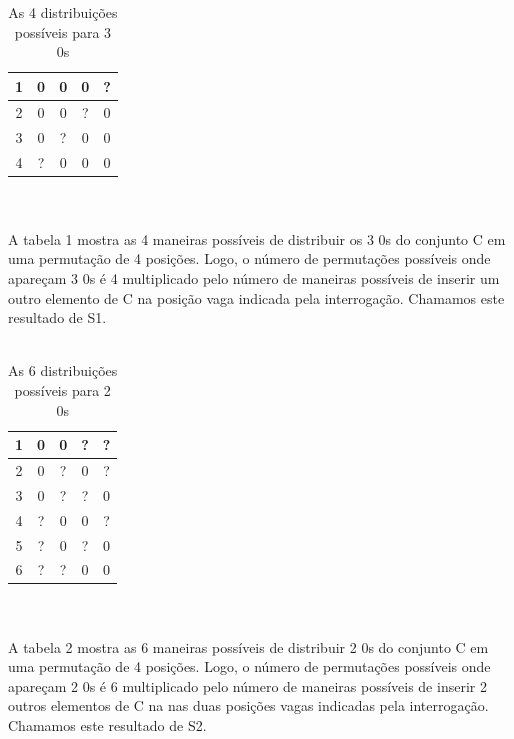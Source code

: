 \documentclass[a4paper,12pt,openany]{book}
\begin{document}
\\
\\
\begin{table}[h]
\begin{center}
	\begin{tabular}{|c||c|c|c|c|}
	\hline
	1 & 0 & 0 & 0 & ?\\
	\hline
	2 & 0 & 0 & ? & 0 \\
	\hline
	3 & 0 & ? & 0 & 0 \\ 
	\hline
	4 & ? & 0 & 0 & 0 \\ 
	\hline
	\end{tabular}
\end{center}
\caption{As 4 distribuições possíveis para 3 0s}
\end{table}
\\ 
\\
A tabela 1 mostra as 4 maneiras possíveis de distribuir os 3 0s do conjunto C em uma permutação de 4 posições. Logo, o número de permutações possíveis onde apareçam 3 0s é 4 multiplicado pelo número de maneiras possíveis de inserir um outro elemento de C na posição vaga indicada pela interrogação. Chamamos este resultado de S1.
\\
\\
\begin{table}[h]
	\begin{center}
		\begin{tabular}{|c||c|c|c|c|}
			\hline
			1 & 0 & 0 & ? & ?\\
			\hline
			2 & 0 & ? & 0 & ? \\
			\hline
			3 & 0 & ? & ? & 0 \\ 
			\hline
			4 & ? & 0 & 0 & ? \\ 
			\hline
			5 & ? & 0 & ? & 0 \\ 
			\hline
			6 & ? & ? & 0 & 0 \\ 
			\hline
		\end{tabular}
	\end{center}
	\caption{As 6 distribuições possíveis para 2 0s}
\end{table}
\\ 
\\
A tabela 2 mostra as 6 maneiras possíveis de distribuir 2 0s do conjunto C em uma permutação de 4 posições. Logo, o número de permutações possíveis onde apareçam 2 0s é 6 multiplicado pelo número de maneiras possíveis de inserir 2 outros elementos de C na nas duas posições vagas indicadas pela interrogação. Chamamos este resultado de S2.
\\
\\
\end{document}
